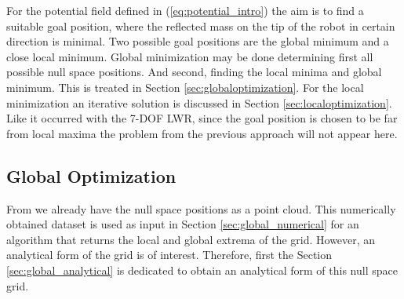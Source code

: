 For the potential field  defined in (\ref{eq:potential_intro}) the aim is to find a suitable goal position, where the reflected mass on the tip of the robot in certain direction is minimal. Two possible goal positions are  the global minimum and a close local minimum. Global minimization may be done determining first all possible null space positions. And second,  finding the local minima and global minimum. This is treated in  Section \ref{sec:globaloptimization}. For the local minimization an iterative solution is discussed in  Section \ref{sec:localoptimization}.
Like it occurred with the 7-DOF LWR, since the goal position is chosen to be far from local maxima the problem from the previous approach will not appear here.


%
%
%








\subsection{Global Optimization}
\label{ch:globaloptimization}
\label{sec:globaloptimization}


From \cite{fabianthesis} we already have the null space positions as a point cloud. This numerically obtained dataset is used as input in Section \ref{sec:global_numerical} for an algorithm that returns the local and global extrema of the grid. However, an analytical form of the grid is of interest. Therefore, first the Section \ref{sec:global_analytical} is dedicated to obtain an analytical form  of this null space grid.




